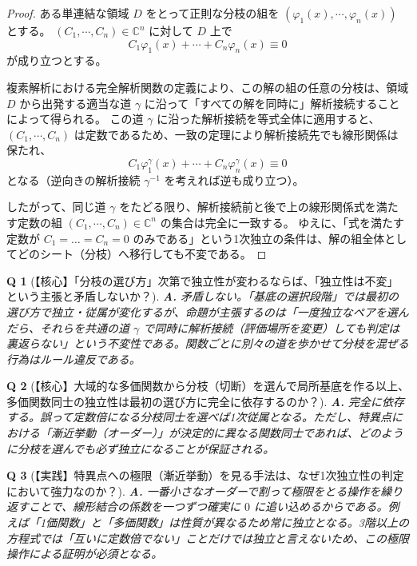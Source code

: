 \documentclass[paper=a4, fontsize=11pt]{jlreq} %
\theoremstyle{break}
\theoremstyle{qa}
\newtheorem*{Q}{Q}
\theoremstyle{remark} %
\begin{document}
\begin{proof}
    ある単連結な領域 $D$ をとって正則な分枝の組を $(\varphi_{1}(x),\cdots,\varphi_{n}(x))$ とする。
    $(C_{1},\cdots,C_{n})\in\mathbb{C}^{n}$ に対して $D$ 上で
    \[
    C_{1}\varphi_{1}(x)+\cdots+C_{n}\varphi_{n}(x) \equiv 0
    \]
    が成り立つとする。
    
    複素解析における完全解析関数の定義により、この解の組の任意の分枝は、領域 $D$ から出発する適当な道 $\gamma$ に沿って「すべての解を同時に」解析接続することによって得られる。
    この道 $\gamma$ に沿った解析接続を等式全体に適用すると、$(C_{1},\cdots,C_{n})$ は定数であるため、一致の定理により解析接続先でも線形関係は保たれ、
    \[
    C_{1}\varphi_{1}^{\gamma}(x)+\cdots+C_{n}\varphi_{n}^{\gamma}(x) \equiv 0
    \]
    となる（逆向きの解析接続 $\gamma^{-1}$ を考えれば逆も成り立つ）。
    
    したがって、同じ道 $\gamma$ をたどる限り、解析接続前と後で上の線形関係式を満たす定数の組 $(C_{1},\cdots,C_{n})\in\mathbb{C}^{n}$ の集合は完全に一致する。
    ゆえに、「式を満たす定数が $C_1=\dots=C_n=0$ のみである」という1次独立の条件は、解の組全体としてどのシート（分枝）へ移行しても不変である。
\end{proof}

\begin{Q}[【核心】「分枝の選び方」次第で独立性が変わるならば、「独立性は不変」という主張と矛盾しないか？]
\textbf{A.} 矛盾しない。「基底の選択段階」では最初の選び方で独立・従属が変化するが、命題が主張するのは「一度独立なペアを選んだら、それらを共通の道 $\gamma$ で同時に解析接続（評価場所を変更）しても判定は裏返らない」という不変性である。関数ごとに別々の道を歩かせて分枝を混ぜる行為はルール違反である。
\end{Q}

\begin{Q}[【核心】大域的な多価関数から分枝（切断）を選んで局所基底を作る以上、多価関数同士の独立性は最初の選び方に完全に依存するのか？]
\textbf{A.} 完全に依存する。誤って定数倍になる分枝同士を選べば1次従属となる。ただし、特異点における「漸近挙動（オーダー）」が決定的に異なる関数同士であれば、どのように分枝を選んでも必ず独立になることが保証される。
\end{Q}

\begin{Q}[【実践】特異点への極限（漸近挙動）を見る手法は、なぜ1次独立性の判定において強力なのか？]
\textbf{A.} 一番小さなオーダーで割って極限をとる操作を繰り返すことで、線形結合の係数を一つずつ確実に $0$ に追い込めるからである。例えば「1価関数」と「多価関数」は性質が異なるため常に独立となる。3階以上の方程式では「互いに定数倍でない」ことだけでは独立と言えないため、この極限操作による証明が必須となる。
\end{Q}
\end{document}
